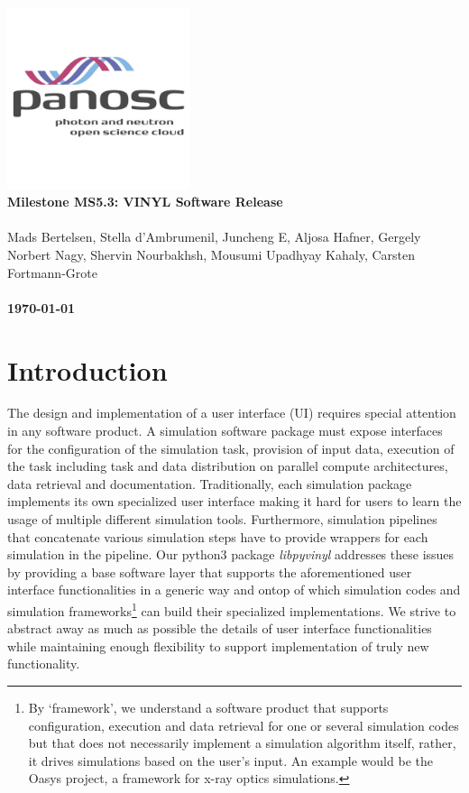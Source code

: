 \documentclass[10pt]{scrartcl}
\begin{document}
\makeatletter
\begin{titlepage}
\thispagestyle{scrheadings}
\ohead{}
\ihead{}
\chead{}
\ifoot{}
\ofoot{}
\noindent%
\includegraphics[width=0.4\textwidth]{figures/PaNOSClogo_web_RGB_512x512.jpg}\\
\Huge{%
\renewcommand{\baselinestretch}{2.0}%
  \textbf{%
    Milestone MS5.3: VINYL Software Release\\
  }%
}%
\\
{%
\Large{%
  Mads Bertelsen,
  Stella d'Ambrumenil,
  Juncheng E,
  Aljosa Hafner,
  Gergely Norbert Nagy,
  Shervin Nourbakhsh,
  Mousumi Upadhyay Kahaly,
  Carsten Fortmann-Grote
  \bigskip\\
  \bigskip\\
  \textbf{\today}%
}}%
\end{titlepage}
\makeatother

\section{Introduction}
The design and
implementation of a user interface (UI) requires special attention in any
software product. A simulation software package must expose interfaces for
the configuration of the simulation task, provision of input data, execution of
the task including task and data distribution on parallel compute architectures,
data retrieval and documentation. Traditionally, each simulation
package implements its own specialized user interface making it hard for users
to learn the usage of multiple different simulation tools.
Furthermore, simulation pipelines that concatenate various simulation steps have to provide wrappers for each
 simulation in the pipeline. Our python3 package \textit{libpyvinyl} addresses
these issues by providing a base software layer that supports the aforementioned
user interface functionalities in a generic way and ontop of which simulation
codes and simulation frameworks\footnote{By `framework', we
  understand a software product that supports configuration, execution and data
  retrieval
  for one or several simulation codes but that does not necessarily implement a
  simulation algorithm itself, rather, it drives simulations based on the user's
  input. An example would be the Oasys project, a framework for x-ray optics
  simulations.} can build their specialized implementations. We strive to
abstract away as much as possible the details of user interface functionalities
while
maintaining enough flexibility to support implementation of truly new functionality.
\end{document}
